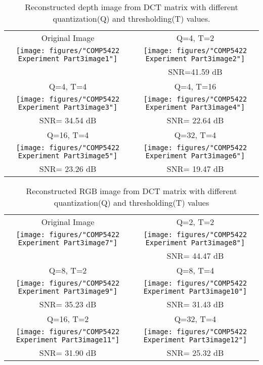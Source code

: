 \begin{table}
\begin{tabular}{c c}
Original Image & Q=4, T=2 \\
\texttt{[image: figures/"COMP5422 Experiment Part3image1"]} &
\texttt{[image: figures/"COMP5422 Experiment Part3image2"]} \\
& SNR=41.59 dB  \\
Q=4, T=4 & Q=4, T=16 \\
\texttt{[image: figures/"COMP5422 Experiment Part3image3"]} &
\texttt{[image: figures/"COMP5422 Experiment Part3image4"]} \\
SNR= 34.54 dB & SNR= 22.64 dB \\
Q=16, T=4 & Q=32, T=4 \\
\texttt{[image: figures/"COMP5422 Experiment Part3image5"]} &
\texttt{[image: figures/"COMP5422 Experiment Part3image6"]} \\
 SNR= 23.26 dB & SNR= 19.47 dB \\\hline
\end{tabular}
\caption{Reconstructed depth image from DCT matrix with different quantization(Q) and thresholding(T) values.}
\label{fig:dctdepth}
\end{table}


\begin{table}
\begin{tabular}{cc}
Original Image & Q=2, T=2 \\ 
\texttt{[image: figures/"COMP5422 Experiment Part3image7"]} &
\texttt{[image: figures/"COMP5422 Experiment Part3image8"]} \\
& SNR= 44.47 dB \\
Q=8, T=2 & Q=8, T=4 \\
\texttt{[image: figures/"COMP5422 Experiment Part3image9"]} &
\texttt{[image: figures/"COMP5422 Experiment Part3image10"]} \\
SNR= 35.23 dB & SNR= 31.43 dB \\
Q=16, T=2 & Q=32, T=4 \\
\texttt{[image: figures/"COMP5422 Experiment Part3image11"]} &
\texttt{[image: figures/"COMP5422 Experiment Part3image12"]} \\
SNR= 31.90 dB & SNR= 25.32 dB \\\hline
\end{tabular}
\caption{Reconstructed RGB image from DCT matrix with different quantization(Q) and thresholding(T) values}
\label{fig:dctrgb}
\end{table}

